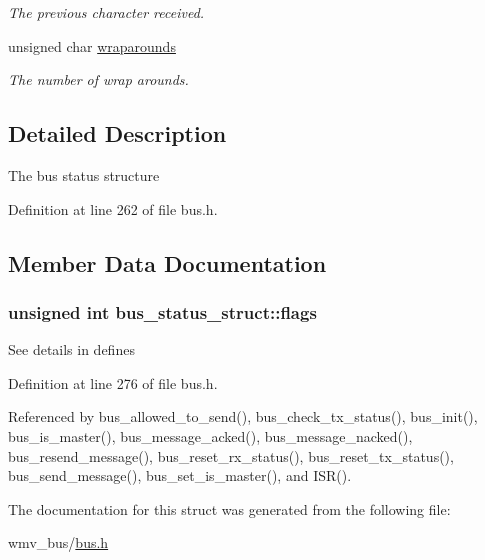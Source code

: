 \begin{CompactItemize}
\begin{CompactList}\small\item\em The previous character received. \item\end{CompactList}\item 
\hypertarget{structbus__status__struct_db0f8de82df21857fa92b57a1ed4b80e}{
unsigned char \hyperlink{structbus__status__struct_db0f8de82df21857fa92b57a1ed4b80e}{wraparounds}}
\label{structbus__status__struct_db0f8de82df21857fa92b57a1ed4b80e}

\begin{CompactList}\small\item\em The number of wrap arounds. \item\end{CompactList}\end{CompactItemize}


\subsection{Detailed Description}
The bus status structure 

Definition at line 262 of file bus.h.

\subsection{Member Data Documentation}
\hypertarget{structbus__status__struct_992015a05b62e4fed7aca512c79fa43f}{
\subsubsection[{flags}]{\setlength{\rightskip}{0pt plus 5cm}unsigned int {\bf bus\_\-status\_\-struct::flags}}}
\label{structbus__status__struct_992015a05b62e4fed7aca512c79fa43f}


See details in defines 

Definition at line 276 of file bus.h.

Referenced by bus\_\-allowed\_\-to\_\-send(), bus\_\-check\_\-tx\_\-status(), bus\_\-init(), bus\_\-is\_\-master(), bus\_\-message\_\-acked(), bus\_\-message\_\-nacked(), bus\_\-resend\_\-message(), bus\_\-reset\_\-rx\_\-status(), bus\_\-reset\_\-tx\_\-status(), bus\_\-send\_\-message(), bus\_\-set\_\-is\_\-master(), and ISR().

The documentation for this struct was generated from the following file:\begin{CompactItemize}
\item 
wmv\_\-bus/\hyperlink{bus_8h}{bus.h}\end{CompactItemize}
